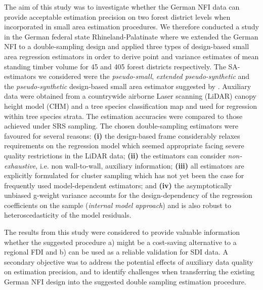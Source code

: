 The aim of this study was to investigate whether the German NFI data can provide acceptable estimation precision on two forest district levels when incorporated in small area estimation procedures. We therefore conducted a study in the German federal state Rhineland-Palatinate where we extended the German NFI to a double-sampling design and applied three types of design-based small area regression estimators in order to derive point and variance estimates of mean standing timber volume for 45 and 405 forest districts respectively. The SA-estimators we considered were the \textit{pseudo-small}, \textit{extended pseudo-synthetic} and the \textit{pseudo-synthetic} design-based small area estimator suggested by \citet{mandallaz2013a, mandallaz2013b}. Auxiliary data were obtained from a countrywide airborne Laser scanning (LiDAR) canopy height model (CHM) and a tree species classification map and used for regression within tree species strata. The estimation accuracies were compared to those achieved under SRS sampling. The chosen double-sampling estimators were favoured for several reasons: \textbf{(i)} the design-based frame considerably relaxes requirements on the regression model which seemed appropriate facing severe quality restrictions in the LiDAR data; \textbf{(ii)} the estimators can consider \textit{non-exhaustive}, i.e. non wall-to-wall, auxiliary information; \textbf{(iii)} all estimators are explicitly formulated for cluster sampling which has not yet been the case for frequently used model-dependent estimators; and \textbf{(iv)} the asymptotically unbiased g-weight variance accounts for the design-dependency of the regression coefficients on the sample (\textit{internal model approach}) and is also robust to heteroscedasticity of the model residuals.\par

The results from this study were considered to provide valuable information whether the suggested procedure a) might be a cost-saving alternative to a regional FDI and b) can be used as a reliable validation for SDI data. A secondary objective was to address the potential effects of auxiliary data quality on estimation precision, and to identify challenges when transferring the existing German NFI design into the suggested double sampling estimation procedure.



